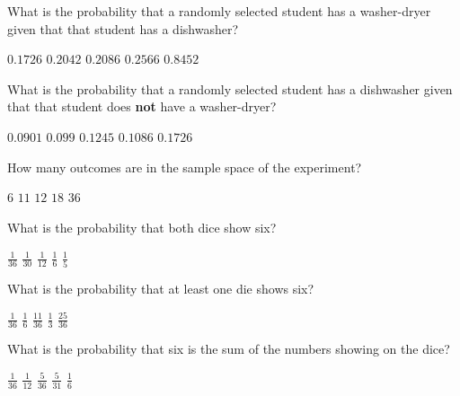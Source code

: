 \documentclass[answers,12pt]{exam}
\begin{document}
\begin{questions}
\question\label{FirstAmes} What is the probability that a randomly selected
student has a washer-dryer given that that student has a dishwasher?\\
\begin{oneparchoices}
\choice $0.1726$ %
\correctchoice $0.2042$
\choice $0.2086$ %
\choice $0.2566$ %
\choice $0.8452$ %
\end{oneparchoices}

\question\label{LastAmes} What is the probability that a randomly selected
student has a dishwasher given that that student does {\bf not}
have a washer-dryer?\\
\begin{oneparchoices}
\correctchoice $0.0901$
\choice $0.099$ %
\choice $0.1245$ %
\choice $0.1086$ %
\choice $0.1726$ %
\end{oneparchoices}
\newpage


\question\label{FirstDice}
How many outcomes are in the sample space of the experiment?\\
\begin{oneparchoices}
\choice $6$ %
\choice $11$ %
\choice $12$ %
\choice $18$
\correctchoice $36$
\end{oneparchoices}

\question What is the probability that both dice show six?\\
\begin{oneparchoices}
\correctchoice $\frac{1}{36}$
\choice $\frac{1}{30}$ %
\choice $\frac{1}{12}$ %
\choice $\frac{1}{6}$
\choice $\frac{1}{5}$ %
\end{oneparchoices}

\question
What is the probability that at least one die shows six?\\
\begin{oneparchoices}
\choice $\frac{1}{36}$
\choice $\frac{1}{6}$
\correctchoice $\frac{11}{36}$
\choice $\frac{1}{3}$ %
\choice $\frac{25}{36}$ %
\end{oneparchoices}

\question\label{LastDice}
What is the probability that six is the sum of the numbers
showing on the dice?\\
\begin{oneparchoices}
\choice $\frac{1}{36}$
\choice $\frac{1}{12}$ %
\correctchoice $\frac{5}{36}$
\choice $\frac{5}{31}$ %
\choice $\frac{1}{6}$ %
\end{oneparchoices}


\end{questions}
\end{document}
